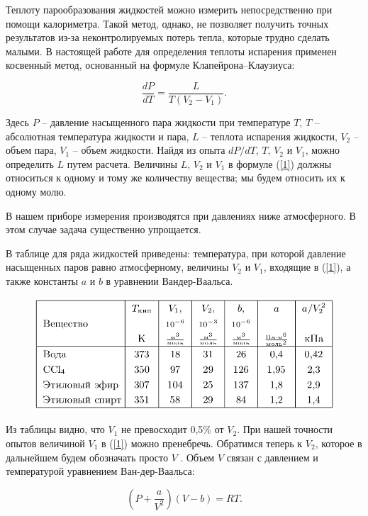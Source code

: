 \documentclass[a4paper,12pt]{article}
\begin{document}
Теплоту парообразования жидкостей можно измерить непосредственно при помощи калориметра. Такой метод, однако, не позволяет получить точных результатов из-за неконтролируемых потерь тепла, которые трудно сделать малыми. В настоящей работе для определения теплоты испарения применен косвенный метод, основанный на формуле Клапейрона–Клаузиуса:

\begin{equation}
   \frac{dP}{dT} = \frac{L}{T(V_2-V_1)}.
   \label{1}
\end{equation}

Здесь $P$ -- давление насыщенного пара жидкости при температуре $T$, $T$ -- абсолютная температура жидкости и пара, $L$ -- теплота испарения жидкости, $V_2$ -- объем пара, $V_1$ -- объем жидкости. Найдя из опыта $dP/dT$, $T$, $V_2$ и $V_1$, можно определить $L$ путем расчета. Величины $L$, $V_2$ и $V_1$ в формуле (\ref{1}) должны относиться к одному и тому же количеству вещества; мы будем относить их к одному молю.

В нашем приборе измерения производятся при давлениях ниже атмосферного. В этом случае задача существенно упрощается.

В таблице для ряда жидкостей приведены: температура, при которой давление насыщенных паров равно атмосферному, величины $V_2$ и $V_1$, входящие в (\ref{1}), а также константы $a$ и $b$ в уравнении Вандер-Ваальса.

\begin{figure}[h]
    \centering
    \includegraphics[width=1\textwidth]{table.png}
\end{figure}

Из таблицы видно, что $V_1$ не превосходит 0,5\% от $V_2$. При нашей точности опытов величиной $V_1$ в (\ref{1}) можно пренебречь. Обратимся теперь к $V_2$, которое в дальнейшем будем обозначать просто $V$ . Объем $V$ связан с давлением и температурой уравнением Ван-дер-Ваальса:

\begin{equation}
   \left(P + \frac{a}{V^2}\right)(V - b) = RT.
   \label{2}
\end{equation}
\end{document}
